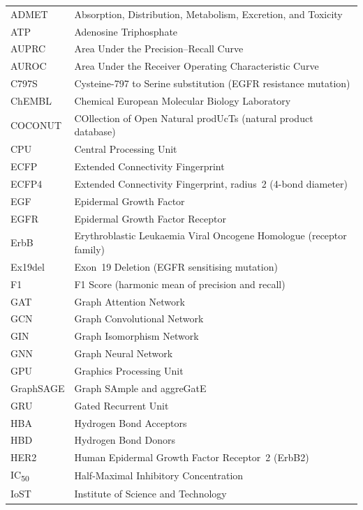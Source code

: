 \begin{longtable}{@{}p{3.5cm}p{10cm}@{}}
ADMET     & Absorption, Distribution, Metabolism,
            Excretion, and Toxicity \\
ATP       & Adenosine Triphosphate \\
AUPRC     & Area Under the Precision--Recall Curve \\
AUROC     & Area Under the Receiver Operating
            Characteristic Curve \\
C797S     & Cysteine-797 to Serine substitution
            (EGFR resistance mutation) \\
ChEMBL    & Chemical European Molecular Biology
            Laboratory \\
COCONUT   & COllection of Open Natural prodUcTs
            (natural product database) \\
CPU       & Central Processing Unit \\
ECFP      & Extended Connectivity Fingerprint \\
ECFP4     & Extended Connectivity Fingerprint,
            radius~2 (4-bond diameter) \\
EGF       & Epidermal Growth Factor \\
EGFR      & Epidermal Growth Factor Receptor \\
ErbB      & Erythroblastic Leukaemia Viral Oncogene
            Homologue (receptor family) \\
Ex19del   & Exon~19 Deletion (EGFR sensitising
            mutation) \\
F1        & F1 Score (harmonic mean of precision
            and recall) \\
GAT       & Graph Attention Network \\
GCN       & Graph Convolutional Network \\
GIN       & Graph Isomorphism Network \\
GNN       & Graph Neural Network \\
GPU       & Graphics Processing Unit \\
GraphSAGE & Graph SAmple and aggreGatE \\
GRU       & Gated Recurrent Unit \\
HBA       & Hydrogen Bond Acceptors \\
HBD       & Hydrogen Bond Donors \\
HER2      & Human Epidermal Growth Factor
            Receptor~2 (ErbB2) \\
IC\textsubscript{50}
          & Half-Maximal Inhibitory Concentration \\
IoST      & Institute of Science and Technology \\

\end{longtable}
